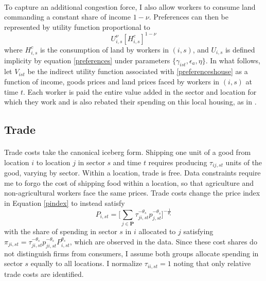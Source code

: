 \documentclass[]{article}
\theoremstyle{plain}
\begin{document}
\paragraph*{}
To capture an additional congestion force, I also allow workers to consume land commanding a constant share of income $1-\nu$. Preferences can then be represented by utility function proportional to
\begin{equation}\label{preferenceshouse}
	U_{i,s}^{\nu}[H^{c}_{i,s}]^{1-\nu}
\end{equation} 
where $H^{c}_{i, s}$ is the consumption of land by workers in $(i, s)$, and $U_{i, s}$ is defined implicity by equation \eqref{preferences} under parameters $\{\gamma_{ist}, \epsilon_{a}, \eta\}$. In what follows, let $V_{ist}$ be the indirect utility function associated with \eqref{preferenceshouse} as a function of income, goods prices and land prices faced by workers in $(i, s)$ at time $t$. Each worker is paid the entire value added in the sector and location for which they work and is also rebated their spending on this local housing, as in \citet{redding2016}.
\subsection*{Trade}
\paragraph*{}
Trade costs take the canonical iceberg form. Shipping one unit of a good from location $i$ to location $j$ in sector $s$ and time $t$ requires producing $\tau_{ij, st}$ units of the good, varying by sector. Within a location, trade is free. Data constraints require me to forgo the cost of shipping food within a location, so that agriculture and non-agricultural workers face the same prices. Trade costs change the price index in Equation \eqref{pindex} to instead satisfy
\begin{equation}\label{tradeprices}
	P_{i, st} = \bigg[\sum_{j \in \mathbf{P}}\tau_{ji,st}^{-\theta_{s}}p_{j, st}^{-\theta_{s}}\bigg]^{-\frac{1}{\theta_{s}}}
\end{equation}
with the share of spending in sector $s$ in $i$ allocated to $j$ satisfying $\pi_{ji, st} = \tau_{ji,st}^{-\theta_{s}}p_{ji, st}^{-\theta_{s}}P_{i,st}^{\theta_{s}}$, which are observed in the data. Since these cost shares do not distinguish firms from consumers, I assume both groups allocate spending in sector $s$ equally to all locations. I normalize $\tau_{ii, st} = 1$ noting that only relative trade costs are identified.
\end{document}
